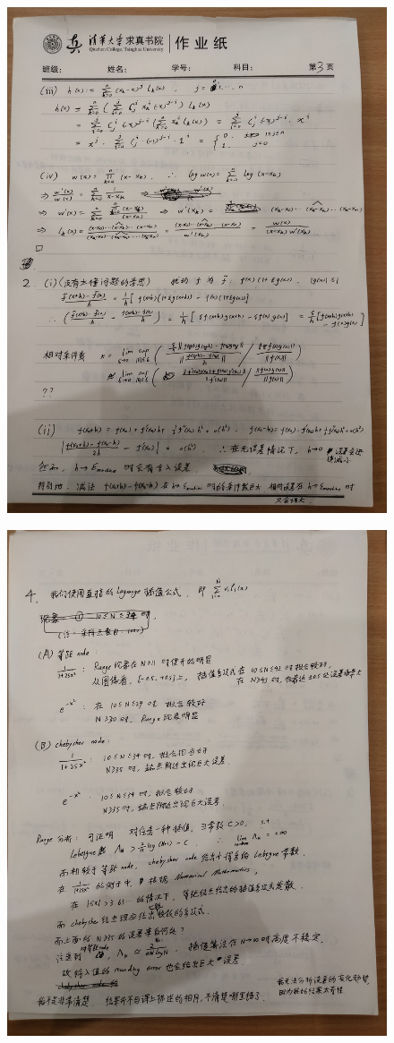 \documentclass{article}
\begin{document}
\begin{figure}[htbp]
	\centering
	\includegraphics[width=\textwidth]{hwna0203.jpg}
\end{figure}

\begin{figure}[htbp]
	\centering
	\includegraphics[width=\textwidth]{hwna0204.jpg}
\end{figure}
\end{document}
